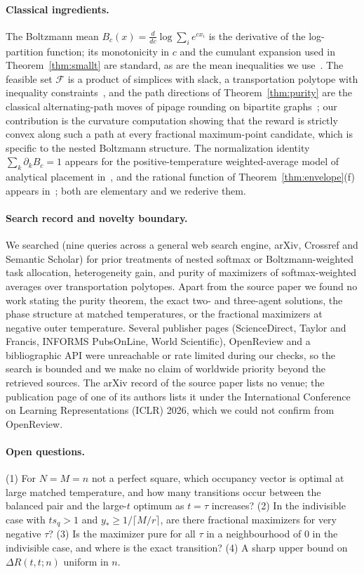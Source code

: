 \documentclass[11pt]{article}
\theoremstyle{plain}
\theoremstyle{definition}
\theoremstyle{remark}
\newcommand{\Feas}{\mathcal{F}}
\begin{document}
\paragraph{Classical ingredients.}
The Boltzmann mean $B_c(x)=\frac{d}{dc}\log\sum_ie^{cx_i}$ is the derivative of the log-partition function; its monotonicity in $c$ and the cumulant expansion used in Theorem~\ref{thm:smallt} are standard, as are the mean inequalities we use~\cite{HLP}. The feasible set $\Feas$ is a product of simplices with slack, a transportation polytope with inequality constraints~\cite{Bolker1972,DeLoeraKim}, and the path directions of Theorem~\ref{thm:purity} are the classical alternating-path moves of pipage rounding on bipartite graphs~\cite{Shioura2009}; our contribution is the curvature computation showing that the reward is strictly convex along such a path at every fractional maximum-point candidate, which is specific to the nested Boltzmann structure. The normalization identity $\sum_k\partial_kB_c=1$ appears for the positive-temperature weighted-average model of analytical placement in~\cite{Liao2023}, and the rational function of Theorem~\ref{thm:envelope}(f) appears in~\cite{CohenFausti}; both are elementary and we rederive them.

\paragraph{Search record and novelty boundary.}
We searched (nine queries across a general web search engine, arXiv, Crossref and Semantic Scholar) for prior treatments of nested softmax or Boltzmann-weighted task allocation, heterogeneity gain, and purity of maximizers of softmax-weighted averages over transportation polytopes. Apart from the source paper we found no work stating the purity theorem, the exact two- and three-agent solutions, the phase structure at matched temperatures, or the fractional maximizers at negative outer temperature. Several publisher pages (ScienceDirect, Taylor and Francis, INFORMS PubsOnLine, World Scientific), OpenReview and a bibliographic API were unreachable or rate limited during our checks, so the search is bounded and we make no claim of worldwide priority beyond the retrieved sources. The arXiv record of the source paper lists no venue; the publication page of one of its authors lists it under the International Conference on Learning Representations (ICLR) 2026, which we could not confirm from OpenReview.

\paragraph{Open questions.}
(1) For $N=M=n$ not a perfect square, which occupancy vector is optimal at large matched temperature, and how many transitions occur between the balanced pair and the large-$t$ optimum as $t=\tau$ increases? (2) In the indivisible case with $ts_q>1$ and $y_*\ge1/\lceil M/r\rceil$, are there fractional maximizers for very negative $\tau$? (3) Is the maximizer pure for all $\tau$ in a neighbourhood of $0$ in the indivisible case, and where is the exact transition? (4) A sharp upper bound on $\Delta R(t,t;n)$ uniform in $n$.


\begingroup
\small

\endgroup
\end{document}

